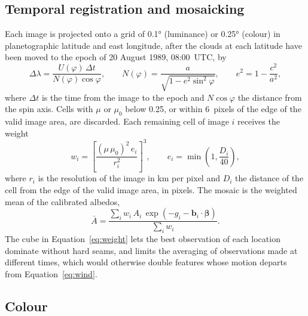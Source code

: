 \documentclass[11pt,a4paper]{article}
\newcommand{\vect}[1]{\mathbf{#1}}
\begin{document}
\subsection{Temporal registration and mosaicking}

Each image is projected onto a grid of \ang{0.1} (luminance) or \ang{0.25} (colour) in
planetographic latitude and east longitude, after the clouds at each latitude have been moved to
the epoch of 20 August 1989, 08:00~UTC, by
\begin{equation}
\Delta\lambda = \frac{U(\varphi)\,\Delta t}{N(\varphi)\cos\varphi}, \qquad
N(\varphi) = \frac{a}{\sqrt{1 - e^{2}\sin^{2}\varphi}}, \qquad e^{2} = 1 - \frac{c^{2}}{a^{2}},
\label{eq:drift}
\end{equation}
where $\Delta t$ is the time from the image to the epoch and $N\cos\varphi$ the distance from the
spin axis. Cells with $\mu$ or $\mu_{0}$ below 0.25, or within 6~pixels of the edge of the valid
image area, are discarded. Each remaining cell of image $i$ receives the weight
\begin{equation}
w_{i} = \left[\frac{(\mu\,\mu_{0})^{2}\, e_{i}}{r_{i}^{2}}\right]^{3}, \qquad
e_{i} = \min\!\left(1, \frac{D_{i}}{40}\right),
\label{eq:weight}
\end{equation}
where $r_{i}$ is the resolution of the image in km per pixel and $D_{i}$ the distance of the cell
from the edge of the valid image area, in pixels. The mosaic is the weighted mean of the calibrated
albedos,
\begin{equation}
\bar{A} = \frac{\sum_{i} w_{i}\,A_{i}\,\exp\left(-g_{i} - \vect{b}_{i}\cdot\boldsymbol{\beta}\right)}
{\sum_{i} w_{i}}.
\label{eq:mosaic}
\end{equation}
The cube in Equation~\eqref{eq:weight} lets the best observation of each location dominate
without hard seams, and limits the averaging of observations made at different times, which
would otherwise double features whose motion departs from Equation~\eqref{eq:wind}.

\subsection{Colour}\label{sec:colour}
\end{document}
